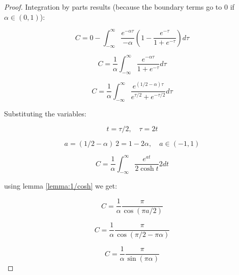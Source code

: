 \documentclass{article}
\theoremstyle{definition}
\begin{document}
\begin{proof}

    Integration by parts results (because the boundary terms go to 0 if $\alpha \in (0,1)$):

    \begin{equation}
        C = 0 - \int_{-\infty}^\infty \frac{e^{-\alpha \tau}}{-\alpha}
        \left( 1 - \frac{e^{-\tau}}{1+e^{-\tau}}\right ) d \tau
    \end{equation}

    \begin{equation}
        C = \frac{1}{\alpha} \int_{-\infty}^\infty \frac{e^{-\alpha \tau}}{1+e^{-\tau}} d \tau
    \end{equation}

    \begin{equation}
        C = \frac{1}{\alpha} \int_{-\infty}^\infty \frac{e^{(1/2-\alpha) \tau}}{e^{\tau/2}+e^{-\tau/2}} d \tau
    \end{equation}

    Substituting the variables:

    \begin{equation}
        t = \tau/2, \quad \tau = 2 t
    \end{equation}

    \begin{equation}
        a = (1/2 - \alpha) \ 2 = 1- 2 \alpha, \quad a \in (-1,1)
    \end{equation}

    \begin{equation}
        C = \frac{1}{\alpha} \int_{-\infty}^\infty \frac{e^{a t}}{2 \cosh{t}} 2 dt
    \end{equation}

    using lemma \ref{lemma:1/cosh} we get:

    \begin{equation}
        C = \frac{1}{\alpha} \frac{\pi}{\cos(\pi a /2)}
    \end{equation}

    \begin{equation}
         C = \frac{1}{\alpha} \frac{\pi}{\cos(\pi/2 - \pi \alpha)}
    \end{equation}

    \begin{equation}
         C = \frac{1}{\alpha} \frac{\pi}{\sin(\pi \alpha)}
    \end{equation}
    
\end{proof}
\end{document}
